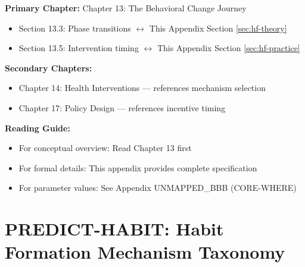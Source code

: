 \begin{tcolorbox}[colback=purple!5!white, colframe=purple!75!black,
    title=Chapter Linkage]

\textbf{Primary Chapter:} Chapter 13: The Behavioral Change Journey
\begin{itemize}[nosep]
\item Section 13.3: Phase transitions $\leftrightarrow$ This Appendix Section \ref{sec:hf-theory}
\item Section 13.5: Intervention timing $\leftrightarrow$ This Appendix Section \ref{sec:hf-practice}
\end{itemize}

\textbf{Secondary Chapters:}
\begin{itemize}[nosep]
\item Chapter 14: Health Interventions --- references mechanism selection
\item Chapter 17: Policy Design --- references incentive timing
\end{itemize}

\textbf{Reading Guide:}
\begin{itemize}[nosep]
\item For conceptual overview: Read Chapter 13 first
\item For formal details: This appendix provides complete specification
\item For parameter values: See Appendix UNMAPPED_BBB (CORE-WHERE)
\end{itemize}

\end{tcolorbox}

\chapter{PREDICT-HABIT: Habit Formation Mechanism Taxonomy}
\label{app:predict-habit}

\begin{abstract}
How do behaviors become habits? This appendix formalizes three competing mechanisms:
(1) learning/experience-good, (2) addiction/reinforcement, and (3) inertia/switching-costs.
Each mechanism generates distinct testable predictions about the temporal pattern of
behavior persistence. We document that Jones, Molitor \& Reif (2025) provides a clean
falsification of addiction models in favor of experience-good learning for annual health
screenings. The key insight: first exposure dominates subsequent exposures in driving
habit formation, with implications for intervention design across domains.
\end{abstract}

